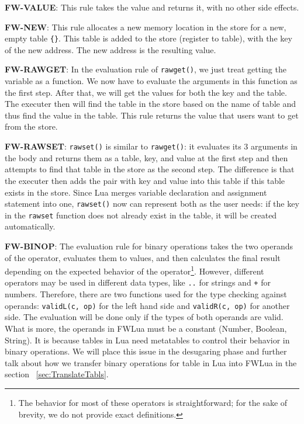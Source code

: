 {\bf FW-VALUE}: This rule takes the value and returns it, with no other side effects.

{\bf FW-NEW}: This rule allocates a new memory location in the store for a new, empty table {\tt \{\}}. This table is added to the store (register to table), with the key of the new address.  The new address is the resulting value.

{\bf FW-RAWGET}: In the evaluation rule of {\tt rawget()},
we just treat getting the variable as a function. We now have to evaluate the arguments in this function as the first step. After that, we will get the values for both the key and the table. The executer then will find the table in the store based on the name of table and thus find the value in the table. This rule returns the value that users want to get from the store.

{\bf FW-RAWSET}: {\tt rawset()} is similar to {\tt rawget()}: it evaluates its 3 arguments in the body and returns them as a table, key, and value at the first step and then attempts to find that table in the store as the second step. The difference is that the executer then adds the pair with key and value into this table if this table exists in the store. Since Lua merges variable declaration and assignment statement into one, {\tt rawset()} now can represent both as the user needs: if the key in the {\tt rawset} function does not already exist in the table, it will be created automatically.

{\bf FW-BINOP}: The evaluation rule for binary operations takes the two operands of the operator, evaluates them to values, and then calculates the final result depending on the expected behavior of the operator\footnote{
  The behavior for most of these operators is straightforward;
  for the sake of brevity, we do not provide exact definitions.
}.
However, different operators may be used in different data types, like {\tt ..} for strings and {\tt +} for numbers. Therefore, there are two functions used for the type checking against operands: {\tt validL(c, op)} for the left hand side and {\tt validR(c, op)} for another side. The evaluation will be done only if the types of both operands are valid.
What is more, the operands in FWLua must be a constant (Number, Boolean, String). It is because tables in Lua need metatables to control their behavior in binary operations. We will place this issue in the desugaring phase and further talk about how we transfer binary operations for table in Lua into FWLua in the section ~\ref{sec:TranslateTabls}.

